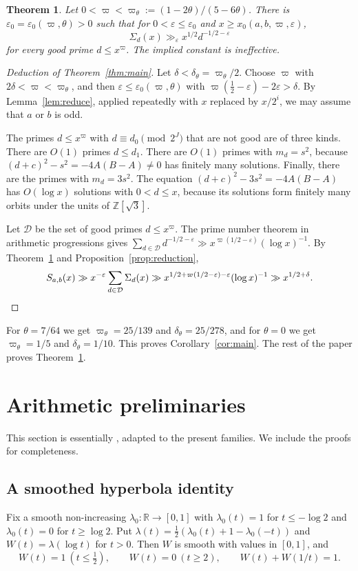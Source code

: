 \documentclass[11pt]{amsart}
\newtheorem{theorem}{Theorem}[section]
\theoremstyle{remark}
\theoremstyle{definition}
\numberwithin{equation}{section}
\newcommand{\Dc}{\mathcal{D}}
\newcommand{\Z}{\mathbb{Z}}
\newcommand{\R}{\mathbb{R}}
\newcommand{\eps}{\varepsilon}
\begin{document}
\begin{theorem}\label{thm:Sigma}
Let $0<\varpi<\varpi_\theta:=(1-2\theta)/(5-6\theta)$. There is $\eps_0=\eps_0(\varpi,\theta)>0$ such that for $0<\eps\le\eps_0$ and $x\ge x_0(a,b,\varpi,\eps)$,
\[
\Sigma_d(x)\gg_\eps x^{1/2}d^{-1/2-\eps}
\]
for every good prime $d\le x^{\varpi}$. The implied constant is ineffective.
\end{theorem}

\begin{proof}[Deduction of Theorem~\ref{thm:main}]
Let $\delta<\delta_\theta=\varpi_\theta/2$. Choose $\varpi$ with $2\delta<\varpi<\varpi_\theta$, and then $\eps\le\eps_0(\varpi,\theta)$ with $\varpi(\frac12-\eps)-2\eps>\delta$. By Lemma~\ref{lem:reduce}, applied repeatedly with $x$ replaced by $x/2^i$, we may assume that $a$ or $b$ is odd.

The primes $d\le x^{\varpi}$ with $d\equiv d_0\pmod{2^J}$ that are not good are of three kinds. There are $O(1)$ primes $d\le d_1$. There are $O(1)$ primes with $m_d=s^2$, because $(d+c)^2-s^2=-4A(B-A)\ne0$ has finitely many solutions. Finally, there are the primes with $m_d=3s^2$. The equation $(d+c)^2-3s^2=-4A(B-A)$ has $O(\log x)$ solutions with $0<d\le x$, because its solutions form finitely many orbits under the units of $\Z[\sqrt3]$.

Let $\Dc$ be the set of good primes $d\le x^{\varpi}$. The prime number theorem in arithmetic progressions gives $\sum_{d\in\Dc}d^{-1/2-\eps}\gg x^{\varpi(1/2-\eps)}(\log x)^{-1}$. By Theorem~\ref{thm:Sigma} and Proposition~\ref{prop:reduction},
\[
S_{a,b}(x)\gg x^{-\eps}\sum_{d\in\Dc}\Sigma_d(x)\gg x^{1/2+\varpi(1/2-\eps)-\eps}(\log x)^{-1}\gg x^{1/2+\delta}.\qedhere
\]
\end{proof}

For $\theta=7/64$ we get $\varpi_\theta=25/139$ and $\delta_\theta=25/278$, and for $\theta=0$ we get $\varpi_\theta=1/5$ and $\delta_\theta=1/10$. This proves Corollary~\ref{cor:main}. The rest of the paper proves Theorem~\ref{thm:Sigma}.

\section{Arithmetic preliminaries}\label{sec:prelim}

This section is essentially \cite[\S5]{I}, adapted to the present families. We include the proofs for completeness.

\subsection{A smoothed hyperbola identity}
Fix a smooth non-increasing $\lambda_0:\R\to[0,1]$ with $\lambda_0(t)=1$ for $t\le-\log2$ and $\lambda_0(t)=0$ for $t\ge\log 2$. Put $\lambda(t)=\frac12(\lambda_0(t)+1-\lambda_0(-t))$ and $W(t)=\lambda(\log t)$ for $t>0$. Then $W$ is smooth with values in $[0,1]$, and
\begin{equation}\label{eq:omega}
W(t)=1\ (t\le\tfrac12),\qquad W(t)=0\ (t\ge2),\qquad W(t)+W(1/t)=1 .
\end{equation}
\end{document}

